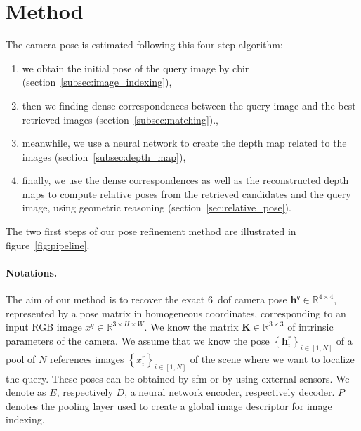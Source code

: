 \section{Method}
\label{sec:method}


The camera pose is estimated following this four-step algorithm:
\begin{enumerate}
	\item we obtain the initial pose of the query image by \ac{cbir} (section~\ref{subsec:image_indexing}),
	\item then we finding dense correspondences between the query image and the best retrieved images (section~\ref{subsec:matching}).,
	\item meanwhile, we use a neural network to create the depth map related to the images (section~\ref{subsec:depth_map}),
	\item finally, we use the dense correspondences as well as the reconstructed depth maps to compute relative poses from the retrieved candidates and the query image, using geometric reasoning (section~\ref{sec:relative_pose}).
\end{enumerate}

The two first steps of our pose refinement method are illustrated in figure~\ref{fig:pipeline}.

\paragraph{Notations.}
The aim of our method is to recover the exact 6~\ac{dof} camera pose $\mathbf{h}^q\in\mathbb{R}^{4\times 4}$, represented by a pose matrix in homogeneous coordinates, corresponding to an input RGB image $x^q\in\mathbb{R}^{3\times H\times W}$. We know the matrix $\mathbf{K}\in\mathbb{R}^{3\times 3}$ of intrinsic parameters of the camera. We assume that we know the pose $\left\{ \mathbf{h}^r_{i} \right\}_{i\in\left[1,N\right]}$ of a pool of $N$ references images $\left\{ x^{r}_i \right\}_{i\in\left[1,N\right]}$ of the scene where we want to localize the query. These poses can be obtained by \ac{sfm} or by using external sensors. We denote as $E$, respectively $D$, a neural network encoder, respectively decoder. $P$ denotes the pooling layer used to create a global image descriptor for image indexing.

